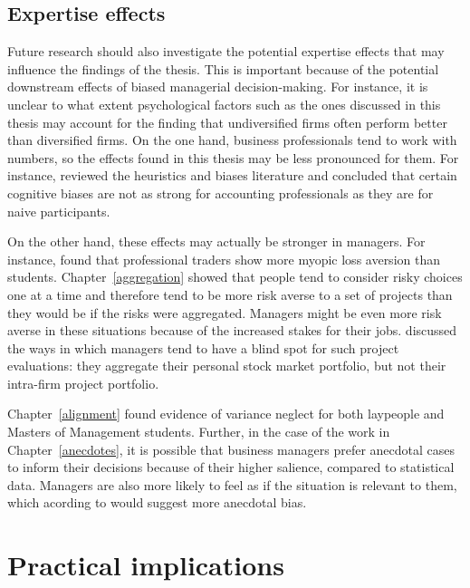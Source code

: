 \documentclass[a4paper, nobind, dvipsnames]{templates/ociamthesis}
\theoremstyle{definition}
\theoremstyle{definition}
\theoremstyle{definition}
\theoremstyle{definition}
\theoremstyle{remark}
\begin{document}
\subsection{Expertise effects}

Future research should also investigate the potential expertise effects that may
influence the findings of the thesis. This is important because of the potential
downstream effects of biased managerial decision-making. For instance, it is
unclear to what extent psychological factors such as the ones discussed in this
thesis may account for the finding that undiversified firms often perform better
than diversified firms. On the one hand, business professionals tend to work
with numbers, so the effects found in this thesis may be less pronounced for
them. For instance, \textcite{smith1991} reviewed the heuristics and biases literature and
concluded that certain cognitive biases are not as strong for accounting
professionals as they are for naive participants.

On the other hand, these effects may actually be stronger in managers. For
instance, \textcite{haigh2005} found that professional traders show more myopic loss
aversion than students. Chapter~\ref{aggregation} showed that people tend to
consider risky choices one at a time and therefore tend to be more risk averse
to a set of projects than they would be if the risks were aggregated. Managers
might be even more risk averse in these situations because of the increased
stakes for their jobs. \textcite{lovallo2020} discussed the ways in which managers tend to
have a blind spot for such project evaluations: they aggregate their personal
stock market portfolio, but not their intra-firm project portfolio.

Chapter~\ref{alignment} found evidence of variance neglect for both laypeople
and Masters of Management students. Further, in the case of the work in
Chapter~\ref{anecdotes}, it is possible that business managers prefer anecdotal
cases to inform their decisions because of their higher salience, compared to
statistical data. Managers are also more likely to feel as if the situation is
relevant to them, which acording to \textcite{freling2020} would suggest more anecdotal
bias.

\hypertarget{practical-implications}{%
\section{Practical implications}\label{practical-implications}}
\end{document}
